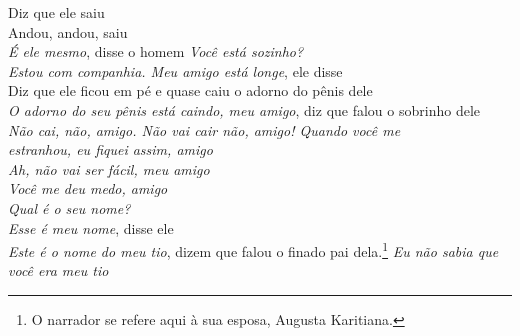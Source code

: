  \smallskip
 \begin{center}\end{center}
 \smallskip
 
\noindent   Diz que ele saiu\\
  Andou, andou, saiu\\
  \textit{É ele mesmo}, disse o homem \textit{Você está sozinho?}\\
  \textit{Estou com companhia. Meu amigo está longe}, ele disse\\
  Diz que ele ficou em pé e quase caiu o adorno do pênis dele\\
  \textit{O adorno do seu pênis está caindo, meu amigo}, diz que falou o sobrinho dele\\
  \textit{Não cai, não, amigo. Não vai cair não, amigo! Quando você me\\
 estranhou, eu fiquei assim, amigo}\\
  \textit{Ah, não vai ser fácil, meu amigo}\\
  \textit{Você me deu medo, amigo}\\
  \textit{Qual é o seu nome?}\\
  \textit{Esse é meu nome}, disse ele\\
  \textit{Este é o nome do meu tio}, dizem que falou o finado pai
 dela.\footnote{O narrador se refere aqui à sua esposa, Augusta Karitiana.}
 \textit{Eu não sabia que você era meu tio}
 
 \smallskip
 \begin{center}\end{center}
 \smallskip
 
